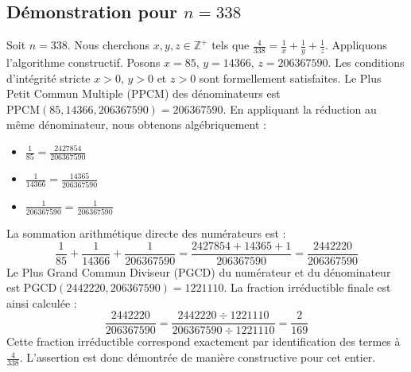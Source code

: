 \documentclass[11pt,a4paper]{article}
\begin{document}
\subsection{Démonstration pour $n = 338$}
Soit $n = 338$. Nous cherchons $x, y, z \in \mathbb{Z}^{+}$ tels que $\frac{4}{338} = \frac{1}{x} + \frac{1}{y} + \frac{1}{z}$.
Appliquons l'algorithme constructif. Posons $x = 85$, $y = 14366$, $z = 206367590$.
Les conditions d'intégrité stricte $x > 0$, $y > 0$ et $z > 0$ sont formellement satisfaites.
Le Plus Petit Commun Multiple (PPCM) des dénominateurs est $\text{PPCM}(85, 14366, 206367590) = 206367590$.
En appliquant la réduction au même dénominateur, nous obtenons algébriquement :
\begin{itemize}
    \item $\frac{1}{85} = \frac{2427854}{206367590}$
    \item $\frac{1}{14366} = \frac{14365}{206367590}$
    \item $\frac{1}{206367590} = \frac{1}{206367590}$
\end{itemize}
La sommation arithmétique directe des numérateurs est :
$$ \frac{1}{85} + \frac{1}{14366} + \frac{1}{206367590} = \frac{2427854 + 14365 + 1}{206367590} = \frac{2442220}{206367590} $$
Le Plus Grand Commun Diviseur (PGCD) du numérateur et du dénominateur est $\text{PGCD}(2442220, 206367590) = 1221110$.
La fraction irréductible finale est ainsi calculée :
$$ \frac{2442220}{206367590} = \frac{2442220 \div 1221110}{206367590 \div 1221110} = \frac{2}{169} $$
Cette fraction irréductible correspond exactement par identification des termes à $\frac{4}{338}$. L'assertion est donc démontrée de manière constructive pour cet entier.
\end{document}
